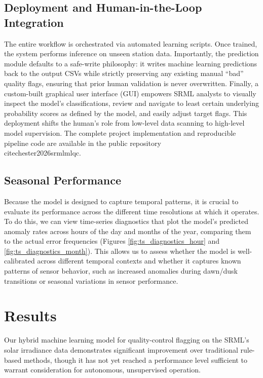 \documentclass[12pt]{article}
\begin{document}
\subsection*{Deployment and Human-in-the-Loop Integration}
The entire workflow is orchestrated via automated learning scripts. Once trained, the system performs inference on unseen station data. Importantly, the prediction module defaults to a safe-write philosophy: it writes machine learning predictions back to the output CSVs while strictly preserving any existing manual ``bad'' quality flags, ensuring that prior human validation is never overwritten. Finally, a custom-built graphical user interface (GUI) empowers SRML analysts to visually inspect the model's classifications, review and navigate to least certain underlying probability scores as defined by the model, and easily adjust target flags. This deployment shifts the human's role from low-level data scanning to high-level model supervision. The complete project implementation and reproducible pipeline code are available in the public repository \\cite{chester2026srmlmlqc}.

\subsection*{Seasonal Performance}
Because the model is designed to capture temporal patterns, it is crucial to evaluate its performance across the different time resolutions at which it operates. To do this, we can view time-series diagnostics that plot the model's predicted anomaly rates across hours of the day and months of the year, comparing them to the actual error frequencies (Figures \ref{fig:ts_diagnostics_hour} and \ref{fig:ts_diagnostics_month}). This allows us to assess whether the model is well-calibrated across different temporal contexts and whether it captures known patterns of sensor behavior, such as increased anomalies during dawn/dusk transitions or seasonal variations in sensor performance.

\section*{Results}
Our hybrid machine learning model for quality-control flagging on the SRML's solar irradiance data demonstrates significant improvement over traditional rule-based methods, though it has not yet reached a performance level sufficient to warrant consideration for autonomous, unsupervised operation. 
\end{document}
